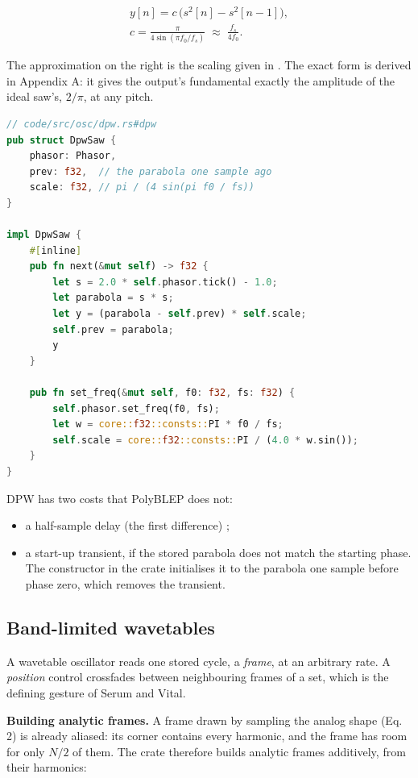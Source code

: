 \documentclass[conference]{IEEEtran}
\begin{document}
\begin{equation*}
\begin{gathered}
y[n] = c\,\big(s^2[n] - s^2[n-1]\big), \\
c = \frac{\pi}{4 \sin(\pi f_0 / f_s)} \;\approx\; \frac{f_s}{4 f_0}.
\end{gathered}
\tag{5}
\end{equation*}

The approximation on the right is the scaling given in \cite{r36}. The exact form is derived in Appendix A: it gives the output's fundamental exactly the amplitude of the ideal saw's, $2/\pi$, at any pitch.

\begin{lstlisting}[language=Rust]
// code/src/osc/dpw.rs#dpw
pub struct DpwSaw {
    phasor: Phasor,
    prev: f32,  // the parabola one sample ago
    scale: f32, // pi / (4 sin(pi f0 / fs))
}

impl DpwSaw {
    #[inline]
    pub fn next(&mut self) -> f32 {
        let s = 2.0 * self.phasor.tick() - 1.0;
        let parabola = s * s;
        let y = (parabola - self.prev) * self.scale;
        self.prev = parabola;
        y
    }

    pub fn set_freq(&mut self, f0: f32, fs: f32) {
        self.phasor.set_freq(f0, fs);
        let w = core::f32::consts::PI * f0 / fs;
        self.scale = core::f32::consts::PI / (4.0 * w.sin());
    }
}
\end{lstlisting}

DPW has two costs that PolyBLEP does not:

\begin{itemize}
\item a half-sample delay (the first difference) \cite{r1};
\item a start-up transient, if the stored parabola does not match the starting phase. The constructor in the crate initialises it to the parabola one sample before phase zero, which removes the transient.
\end{itemize}

\setcounter{subsection}{3}
\subsection{Band-limited wavetables}
A wavetable oscillator reads one stored cycle, a \emph{frame}, at an arbitrary rate. A \emph{position} control crossfades between neighbouring frames of a set, which is the defining gesture of Serum and Vital.

\textbf{Building analytic frames.} A frame drawn by sampling the analog shape (Eq. 2) is already aliased: its corner contains every harmonic, and the frame has room for only $N/2$ of them. The crate therefore builds analytic frames additively, from their harmonics:
\end{document}
